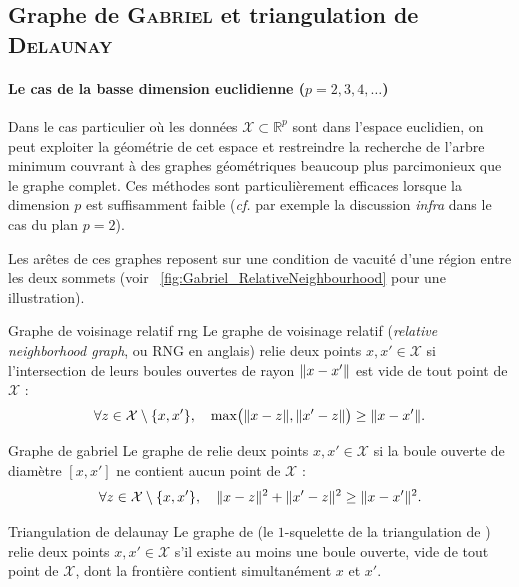\subsection{Graphe de \textsc{Gabriel} et triangulation de \textsc{Delaunay}}

\paragraph{Le cas de la basse dimension euclidienne ($p=2, 3, 4 , \ldots$)}
Dans le cas particulier où les données $\mathcal X \subset \mathbb R^p$ sont dans l'espace euclidien, on peut exploiter la géométrie de cet espace et restreindre la recherche de l'arbre minimum couvrant à des graphes géométriques beaucoup plus parcimonieux que le graphe complet. Ces méthodes sont particulièrement efficaces lorsque la dimension $p$ est suffisamment faible (\emph{cf.} par exemple la discussion \emph{infra} dans le cas du plan $p=2$).

Les arêtes de ces graphes reposent sur une condition de vacuité d'une région entre les deux sommets (voir \Fig~\ref{fig:Gabriel_RelativeNeighbourhood} pour une illustration).

\begin{Definition}{Graphe de voisinage relatif \cite{Toussaint1980}}{rng}
Le graphe de voisinage relatif (\emph{relative neighborhood graph}, ou RNG en anglais) relie deux points $x, x' \in \mathcal X$ si l'intersection de leurs boules ouvertes de rayon $\lVert x-x' \rVert$ est vide de tout point de $\mathcal X$ :
\[
    \forall z \in \mathcal X \setminus \{x,x'\}, \quad \max \bigl( \lVert x-z \rVert, \lVert x'-z \rVert \bigr) \ge \lVert x-x' \rVert.
\]
\end{Definition}

\begin{Definition}{Graphe de  \cite{GabrielSokal1969}}{gabriel}
Le graphe de  relie deux points $x, x' \in \mathcal X$ si la boule ouverte de diamètre $[x,x']$ ne contient aucun point de $\mathcal X$ :
\[
    \forall z \in \mathcal X \setminus \{x,x'\}, \quad \lVert x-z \rVert^2 + \lVert x'-z \rVert^2 \ge \lVert x-x' \rVert^2.
\]
\end{Definition}

\begin{Definition}{Triangulation de  \cite{Delaunay1934, BoissonnatChazalYvinec}}{delaunay}
Le graphe de  (le $1$-squelette de la triangulation de ) relie deux points $x, x' \in \mathcal X$ s'il existe au moins une boule ouverte, vide de tout point de $\mathcal X$, dont la frontière contient simultanément $x$ et $x'$.
\end{Definition}

